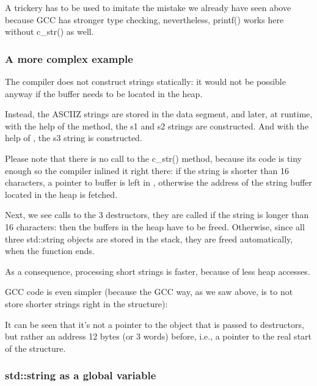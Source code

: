 A trickery has to be used to imitate the mistake we already have seen above because GCC
has stronger type checking, nevertheless, printf() works here without c\_str() as well.

\subsubsection{A more complex example}





The compiler does not construct strings statically: it would not be possible anyway if the buffer needs to be located
in the \gls{heap}.

Instead, the \ac{ASCIIZ} strings are stored in the data segment, and later, at runtime,
with the help of the  method, the s1 and s2 strings are constructed.
And with the help of , the s3 string is constructed.

Please note that 
there is no call to the c\_str() method, because its code is tiny enough so the compiler
inlined it right there: if the string is shorter than 16 characters, a pointer to buffer is left
in \EAX, otherwise the address of the string buffer located in the \gls{heap} is fetched.

Next, we see calls to the 3 destructors, they are called if
the string is longer than 16 characters: then the buffers in the \gls{heap} have to be freed.
Otherwise, since all three std::string objects
are stored in the stack, they are freed automatically, when the function ends.

As a consequence, processing short strings is faster, because of less \gls{heap} accesses.

GCC code is even simpler (because the GCC way, as we saw above, is to not store
shorter strings right in the structure):



It can be seen that it's not a pointer to the object that is passed to destructors, but rather an address 12 bytes (or 3 words)
before, i.e., a pointer to the real start of the structure.

\subsubsection{std::string as a global variable}
\label{sec:std_string_as_global_variable}

